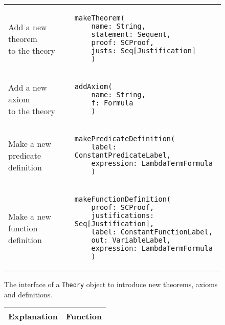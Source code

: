 {\begin{figure}[hp]
\begin{center}
\begin{tabular}{l|l}
          \makecell[l]{Add a new theorem    \\to the theory} &
          \begin{lstlisting}[linewidth=19.5em]
  makeTheorem(
    name: String,
    statement: Sequent,
    proof: SCProof,
    justs: Seq[Justification]
    )
          \end{lstlisting}
          \\ %

          \makecell[l]{Add a new axiom      \\ to the theory} &
          \begin{lstlisting}[linewidth=19.5em]
  addAxiom(
    name: String,
    f: Formula
    )
          \end{lstlisting}
          \\ %

          \makecell[l]{Make a new           \\predicate definition} &
          \begin{lstlisting}[linewidth=19.5em]
  makePredicateDefinition(
    label: ConstantPredicateLabel,
    expression: LambdaTermFormula
    )
          \end{lstlisting}
          \\ %

          \makecell[l]{Make a new           \\function definition} &
          \begin{lstlisting}[linewidth=19.5em]
  makeFunctionDefinition(
    proof: SCProof,
    justifications: Seq[Justification],
    label: ConstantFunctionLabel,
    out: VariableLabel,
    expression: LambdaTermFormula
    )
          \end{lstlisting}
          \\ %

        \end{tabular}
        \caption{The interface of a \lstinline{Theory}{} object to introduce new theorems, axioms and definitions.}

        \label{fig:theorysetters}
      \end{center}
    \end{figure}







\iffalse
    \begin{figure}[hp]
      \begin{center}
        \begin{tabular}{l|l}
          Explanation & Function
          \\ \hline


\end{tabular}
\end{center}
\end{figure}}
